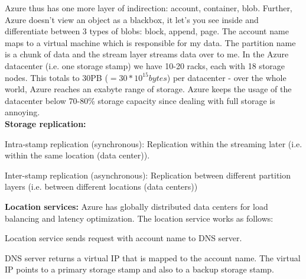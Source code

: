 \documentclass[11pt,oneside,a4paper]{article}
\begin{document}
Azure thus has one more layer of indirection: account, container, blob. Further, Azure doesn't view an object as a blackbox, it let's you see inside and differentiate between 3 types of blobs: block, append, page. The account name maps to a virtual machine which is responsible for my data. The partition name is a chunk of data and the stream layer streams data over to me. In the Azure datacenter (i.e. one storage stamp) we have 10-20 racks, each with 18 storage nodes. This totals to 30PB ($= 30*10^{15} bytes$) per datacenter - over the whole world, Azure reaches an exabyte range of storage. Azure keeps the usage of the datacenter below 70-80\% storage capacity since dealing with full storage is annoying.\\

\textbf{Storage replication:}

\begin{compactitem}
	\item Intra-stamp replication (synchronous): Replication within the streaming later (i.e. within the same location (data center)).
	\item Inter-stamp replication (asynchronous): Replication between different partition layers (i.e. between different locations (data centers))\\
\end{compactitem}

\textbf{Location services:} Azure has globally distributed data centers for load balancing and latency optimization. The location service works as follows:

\begin{compactenum}
	\item Location service sends request with account name to DNS server.
	\item DNS server returns a virtual IP that is mapped to the account name. The virtual IP points to a primary storage stamp and also to a backup storage stamp.
\end{compactenum}
\end{document}

